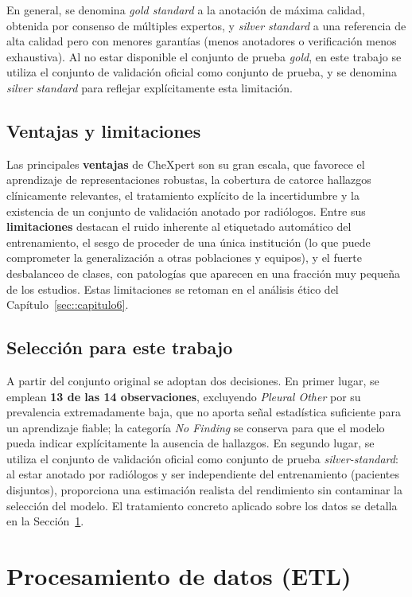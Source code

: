 En general, se denomina \textit{gold standard} a la anotación de máxima calidad,
obtenida por consenso de múltiples expertos, y \textit{silver standard} a una
referencia de alta calidad pero con menores garantías (menos anotadores o
verificación menos exhaustiva). Al no estar disponible el conjunto de prueba
\textit{gold}, en este trabajo se utiliza el conjunto de validación oficial como
conjunto de prueba, y se denomina \textit{silver standard} para reflejar
explícitamente esta limitación.

\subsection{Ventajas y limitaciones}

Las principales \textbf{ventajas} de CheXpert son su gran escala, que favorece el
aprendizaje de representaciones robustas, la cobertura de catorce hallazgos
clínicamente relevantes, el tratamiento explícito de la incertidumbre y la
existencia de un conjunto de validación anotado por radiólogos. Entre sus
\textbf{limitaciones} destacan el ruido inherente al etiquetado automático del
entrenamiento, el sesgo de proceder de una única institución (lo que puede
comprometer la generalización a otras poblaciones y equipos), y el fuerte
desbalanceo de clases, con patologías que aparecen en una fracción muy pequeña de
los estudios. Estas limitaciones se retoman en el análisis ético del
Capítulo~\ref{sec::capitulo6}.

\subsection{Selección para este trabajo}

A partir del conjunto original se adoptan dos decisiones. En primer lugar, se
emplean \textbf{13 de las 14 observaciones}, excluyendo \textit{Pleural Other}
por su prevalencia extremadamente baja, que no aporta señal estadística
suficiente para un aprendizaje fiable; la categoría \textit{No Finding} se
conserva para que el modelo pueda indicar explícitamente la ausencia de
hallazgos. En segundo lugar, se utiliza el conjunto de validación oficial como
conjunto de prueba \textit{silver-standard}: al estar anotado por radiólogos y
ser independiente del entrenamiento (pacientes disjuntos), proporciona una
estimación realista del rendimiento sin contaminar la selección del modelo. El
tratamiento concreto aplicado sobre los datos se detalla en la
Sección~\ref{sec::mm_etl}.


\section{Procesamiento de datos (ETL)}
\label{sec::mm_etl}

